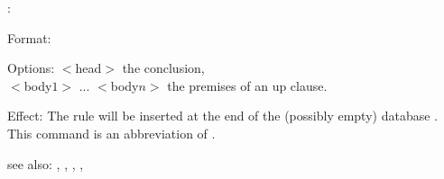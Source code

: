 \azup:

Format: 

Options: $<$head$>$ the conclusion,\\
         $<$body$1>$ ... $<$body$n>$ the premises of an up clause.

Effect: The rule  will be inserted at the end of the 
	(possibly empty) database .
        This command is an abbreviation of .

see also: \az, \azrl, \consult, \destroy, \replace
